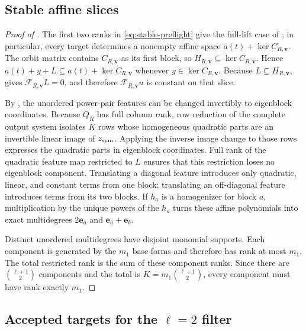\documentclass[11pt]{article}
\begin{document}
\subsection{Stable affine slices}\label{app:proof-stable-slices}

\begin{proof}[Proof of ]
The first two ranks in \eqref{eq:stable-preflight} give the full-lift case of
; in particular, every target determines a
nonempty affine space $a(t)+\ker C_{R,\mathbf v}$.  The orbit matrix contains
$C_{R,\mathbf v}$ as its first block, so
$H_{R,\mathbf v}\subseteq\ker C_{R,\mathbf v}$.  Hence
$a(t)+y+L\subseteq a(t)+\ker C_{R,\mathbf v}$ whenever
$y\in\ker C_{R,\mathbf v}$.  Because
$L\subseteq H_{R,\mathbf v}$,  gives
$\mathcal F_{R,\mathbf v}L=0$, and therefore $\mathcal F_{R,\mathbf v}u$ is constant on that
slice.

By , the unordered power-pair features can be
changed invertibly to eigenblock coordinates.  Because $Q_R$ has full column
rank, row reduction of the complete output system isolates $K$ rows whose
homogeneous quadratic parts are an invertible linear image of
$z_{\rm sym}$.  Applying the inverse image change to those rows expresses the
quadratic parts in eigenblock coordinates.  Full rank of the quadratic feature
map restricted to $L$ ensures that this restriction loses no eigenblock
component.  Translating a diagonal feature introduces only
quadratic, linear, and constant terms from one block; translating an
off-diagonal feature introduces terms from its two blocks.  If $h_a$ is a
homogenizer for block $a$, multiplication by the unique powers of the $h_a$
turns these affine polynomials into exact multidegrees $2\mathbf e_a$ and
$\mathbf e_a+\mathbf e_b$.

Distinct unordered multidegrees have disjoint monomial supports.  Each
component is generated by the $m_1$ base forms and therefore has rank at most
$m_1$.  The total restricted rank is the sum of these component ranks.  Since
there are $\binom{\ell+1}{2}$ components and the total is
$K=m_1\binom{\ell+1}{2}$, every component must have rank exactly $m_1$.
\end{proof}

\subsection{Accepted targets for the \texorpdfstring{$\ell=2$}{l=2} filter}\label{app:proof-l2-filter}
\end{document}
